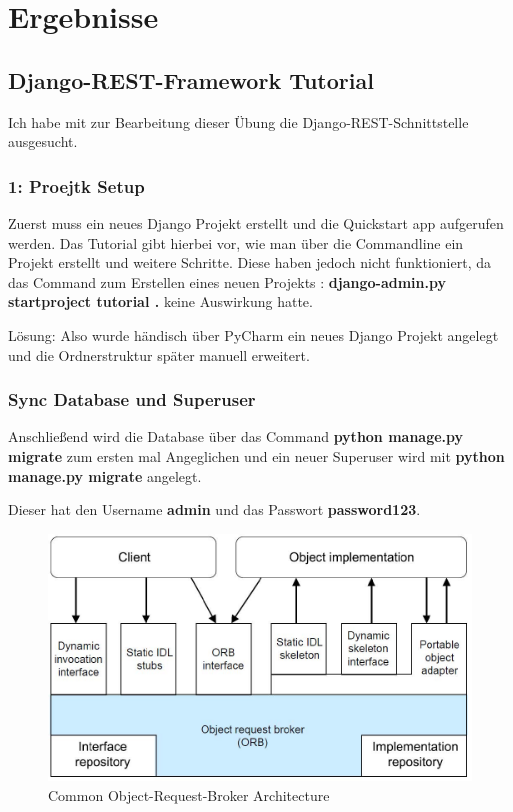 
\section{Ergebnisse}
\label{sec:Ergebnisse}

\subsection{Django-REST-Framework Tutorial}
Ich habe mit zur Bearbeitung dieser Übung die Django-REST-Schnittstelle ausgesucht.

\subsubsection{1: Proejtk Setup}
Zuerst muss ein neues Django Projekt erstellt und die Quickstart app aufgerufen werden.
Das Tutorial gibt hierbei vor, wie man über die Commandline ein Projekt erstellt und weitere Schritte. Diese haben jedoch nicht funktioniert, da das Command zum Erstellen eines neuen Projekts : \textbf{django-admin.py startproject tutorial .} keine Auswirkung hatte.

Lösung: Also wurde händisch über PyCharm ein neues Django Projekt angelegt und die Ordnerstruktur später manuell erweitert.

\subsubsection{Sync Database und Superuser}

Anschließend wird die Database über das Command \textbf{python manage.py migrate} zum ersten mal Angeglichen und ein neuer Superuser wird mit \textbf{python manage.py migrate} angelegt.

Dieser hat den Username \textbf{admin} und das Passwort \textbf{password123}.

  

\begin{figure}[!h]
	\begin{center}
		\includegraphics[width=0.5\linewidth]{images/corba.jpg}
		\caption{Common Object-Request-Broker Architecture \cite{tanenbaum2007verteilte}}
		\label{broker}
	\end{center}
\end{figure}

